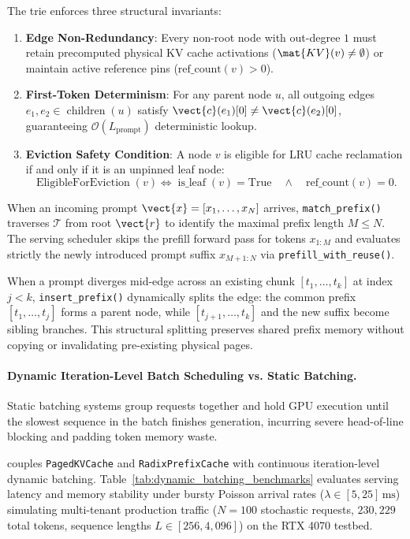 The trie enforces three structural invariants:
\begin{enumerate}
    \item \textbf{Edge Non-Redundancy}: Every non-root node with out-degree $1$ must retain precomputed physical KV cache activations ($\mat{KV}(v) \neq \emptyset$) or maintain active reference pins ($\text{ref\_count}(v) > 0$).
    \item \textbf{First-Token Determinism}: For any parent node $u$, all outgoing edges $e_1, e_2 \in \operatorname{children}(u)$ satisfy $\vect{c}(e_1)[0] \neq \vect{c}(e_2)[0]$, guaranteeing $\mathcal{O}(L_{\text{prompt}})$ deterministic lookup.
    \item \textbf{Eviction Safety Condition}: A node $v$ is eligible for LRU cache reclamation if and only if it is an unpinned leaf node:
    \begin{equation}
    \operatorname{EligibleForEviction}(v) \iff \operatorname{is\_leaf}(v) = \text{True} \quad \wedge \quad \text{ref\_count}(v) = 0.
    \end{equation}
\end{enumerate}

When an incoming prompt $\vect{x} = [x_1, \dots, x_N]$ arrives, \texttt{match\_prefix()} traverses $\mathcal{T}$ from root $\vect{r}$ to identify the maximal prefix length $M \le N$. The serving scheduler skips the prefill forward pass for tokens $x_{1:M}$ and evaluates strictly the newly introduced prompt suffix $x_{M+1:N}$ via \texttt{prefill\_with\_reuse()}.

When a prompt diverges mid-edge across an existing chunk $[t_1, \dots, t_k]$ at index $j < k$, \texttt{insert\_prefix()} dynamically splits the edge: the common prefix $[t_1, \dots, t_j]$ forms a parent node, while $[t_{j+1}, \dots, t_k]$ and the new suffix become sibling branches. This structural splitting preserves shared prefix memory without copying or invalidating pre-existing physical pages.

\paragraph{Dynamic Iteration-Level Batch Scheduling vs. Static Batching.}
Static batching systems group requests together and hold GPU execution until the slowest sequence in the batch finishes generation, incurring severe head-of-line blocking and padding token memory waste.

\neuralops{} couples \texttt{PagedKVCache} and \texttt{RadixPrefixCache} with continuous iteration-level dynamic batching. Table~\ref{tab:dynamic_batching_benchmarks} evaluates serving latency and memory stability under bursty Poisson arrival rates ($\lambda \in [5, 25]\,\text{ms}$) simulating multi-tenant production traffic ($N=100$ stochastic requests, $230{,}229$ total tokens, sequence lengths $L \in [256, 4{,}096]$) on the RTX 4070 testbed.

